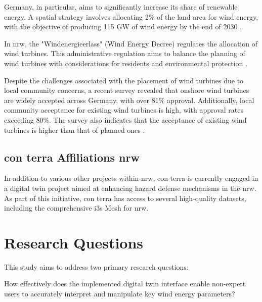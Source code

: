 \documentclass[11pt, titlepage, a4paper]{scrartcl}
\begin{document}
\begin{linenumbers}
    Germany, in particular, aims to significantly increase its share of renewable energy. A spatial strategy involves allocating 2\% of the land area for wind energy, with the objective of producing 115 GW of wind energy by the end of 2030 \cite{WindenergieLand}.


    In \gls{nrw}, the "Windenergieerlass" (Wind Energy Decree) \cite{nrwErlassFurPlanung} regulates the allocation of wind turbines. This administrative regulation aims to balance the planning of wind turbines with considerations for residents and environmental protection \cite{nrwErlassFurPlanung}.

    Despite the challenges associated with the placement of wind turbines due to local community concerns, a recent survey revealed that onshore wind turbines are widely accepted across Germany, with over 81\% approval. Additionally, local community acceptance for existing wind turbines is high, with approval rates exceeding 80\%. The survey also indicates that the acceptance of existing wind turbines is higher than that of planned ones \cite{fachagenturwindenergieanlandUmfrageZurAkzeptanz}.

    \subsection{con terra Affiliations \gls{nrw}}
    In addition to various other projects within \gls{nrw}, con terra is currently engaged in a digital twin project aimed at enhancing hazard defense mechanisms in the \gls{nrw}. As part of this initiative, con terra has access to several high-quality datasets, including the comprehensive \gls{i3s} Mesh for \gls{nrw}.


    \section{Research Questions}

    This study aims to address two primary research questions:

    \begin{questions}
        \item \label{rq:first_q} How effectively does the implemented digital twin interface enable non-expert users to accurately interpret and manipulate key wind energy parameters?

    \end{questions}


\end{linenumbers}
\end{document}
